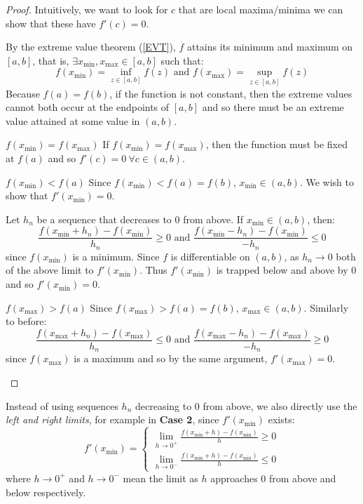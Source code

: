\documentclass[../main.tex]{subfiles}
\begin{document}
\begin{proof}
  Intuitively, we want to look for $c$ that are local maxima/minima we can show that these have $f'(c) = 0$.

  By the extreme value theorem (\cref{EVT}), $f$ attains its minimum and maximum on $[a, b]$, that is, $\exists x_{\text{min}}, x_{\text{max}} \in [a, b]$ such that:
  \[
    f(x_{\text{min}}) = \inf_{z \in [a, b]} f(z) \text{ and } f(x_{\text{max}}) = \sup_{z \in [a, b]} f(z)
  \]
  Because $f(a) = f(b)$, if the function is not constant, then the extreme values cannot both occur at the endpoints of $[a, b]$ and so there must be an extreme value attained at some value in $(a, b)$.
  \begin{proofcases}
    \begin{case}{$f(x_{\text{min}}) = f(x_{\text{max}})$}
      If $f(x_{\text{min}}) = f(x_{\text{max}})$, then the function must be fixed at $f(a)$ and so $f'(c) = 0\ \forall c \in (a, b)$.
    \end{case}
    \begin{case}{$f(x_{\text{min}}) < f(a)$}
      Since $f(x_{\text{min}}) < f(a) = f(b)$, $x_{\text{min}} \in (a, b)$.
      We wish to show that $f'(x_{\text{min}}) = 0$.

      Let $h_n$ be a sequence that decreases to $0$ from above.
      If $x_{\text{min}} \in (a, b)$, then:
      \[
       \frac{f(x_{\text{min}} + h_n) - f(x_{\text{min}})}{h_n} \geq 0 \text{ and }
       \frac{f(x_{\text{min}} - h_n) - f(x_{\text{min}})}{-h_n} \leq 0
      \]
      since $f(x_{\text{min}})$ is a minimum.
      Since $f$ is differentiable on $(a, b)$, as $h_n \to 0$ both of the above limit to $f'(x_{\text{min}})$.
      Thus $f'(x_{\text{min}})$ is trapped below and above by 0 and so $f'(x_{\text{min}}) = 0$.
    \end{case}
    \begin{case}{$f(x_{\text{max}}) > f(a)$}
      Since $f(x_{\text{max}}) > f(a) = f(b)$, $x_{\text{max}} \in (a, b)$.
      Similarly to before:
      \[
       \frac{f(x_{\text{max}} + h_n) - f(x_{\text{max}})}{h_n} \leq 0 \text{ and }
       \frac{f(x_{\text{max}} - h_n) - f(x_{\text{max}})}{-h_n} \geq 0
      \]
      since $f(x_{\text{max}})$ is a maximum and so by the same argument, $f'(x_{\text{max}}) = 0$.
    \end{case}
  \end{proofcases}
\end{proof}
\begin{remark}
  Instead of using sequences $h_n$ decreasing to 0 from above, we also directly use the \textit{left and right limits}, for example in \textbf{Case 2}, since $f'(x_{\text{min}})$ exists:
  \[
    f'(x_{\text{min}}) = \begin{cases}
     \lim_{h \to 0^{+}} \frac{f(x_{\text{min}} + h) - f(x_{\text{min}})}{h} \geq 0 \\
     \lim_{h \to 0^{-}} \frac{f(x_{\text{min}} + h) - f(x_{\text{min}})}{h} \leq 0
    \end{cases}
  \]
  where $h \to 0^{+}$ and $h \to 0^{-}$ mean the limit as $h$ approaches 0 from above and below respectively.
\end{remark}
\end{document}

